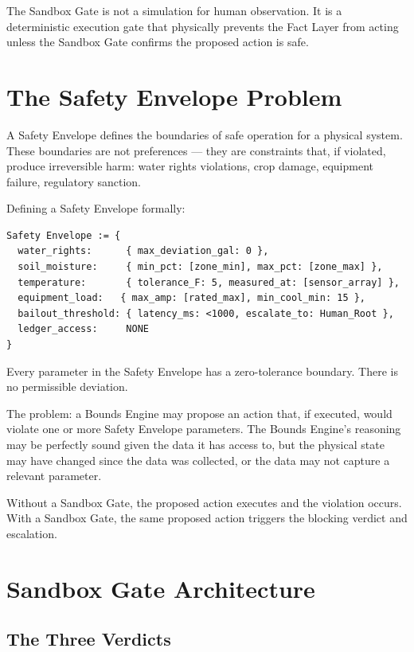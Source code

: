 \documentclass[12pt]{article}
\begin{document}
The Sandbox Gate is not a simulation for human observation. It is a deterministic execution gate that physically prevents the Fact Layer from acting unless the Sandbox Gate confirms the proposed action is safe.

\section{The Safety Envelope Problem}
\label{sec:problem}

A Safety Envelope defines the boundaries of safe operation for a physical system. These boundaries are not preferences --- they are constraints that, if violated, produce irreversible harm: water rights violations, crop damage, equipment failure, regulatory sanction.

Defining a Safety Envelope formally:
\begin{verbatim}
Safety Envelope := {
  water_rights:      { max_deviation_gal: 0 },
  soil_moisture:     { min_pct: [zone_min], max_pct: [zone_max] },
  temperature:       { tolerance_F: 5, measured_at: [sensor_array] },
  equipment_load:   { max_amp: [rated_max], min_cool_min: 15 },
  bailout_threshold: { latency_ms: <1000, escalate_to: Human_Root },
  ledger_access:     NONE
}
\end{verbatim}

Every parameter in the Safety Envelope has a zero-tolerance boundary. There is no permissible deviation.

The problem: a Bounds Engine may propose an action that, if executed, would violate one or more Safety Envelope parameters. The Bounds Engine's reasoning may be perfectly sound given the data it has access to, but the physical state may have changed since the data was collected, or the data may not capture a relevant parameter.

Without a Sandbox Gate, the proposed action executes and the violation occurs. With a Sandbox Gate, the same proposed action triggers the blocking verdict and escalation.

\section{Sandbox Gate Architecture}
\label{sec:architecture}

\subsection{The Three Verdicts}
\end{document}
